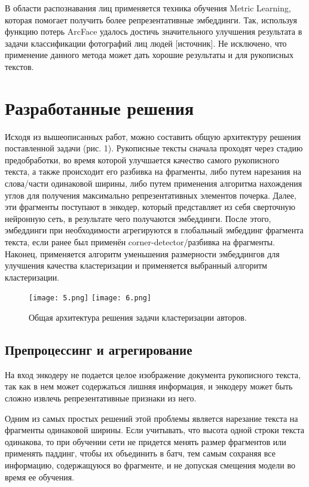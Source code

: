     В области распознавания лиц применяется техника обучения Metric Learning, которая помогает получить более репрезентативные эмбеддинги. Так, используя функцию потерь ArcFace удалось достичь значительного улучшения результата в задачи классификации фотографий лиц людей [источник]. Не исключено, что применение данного метода может дать хорошие результаты и для рукописных текстов.
    
\newpage
\section{Разработанные решения}

    Исходя из вышеописанных работ, можно составить общую архитектуру решения поставленной задачи (рис. 1). Рукописные тексты сначала проходят через стадию предобработки, во время которой улучшается качество самого рукописного текста, а также происходит его разбивка на фрагменты, либо путем нарезания на слова/части одинаковой ширины, либо путем применения алгоритма нахождения углов для получения максимально репрезентативных элементов почерка.
    Далее, эти фрагменты поступают в энкодер, который представляет из себя сверточную нейронную сеть, в результате чего получаются эмбеддинги. После этого, эмбеддинги при необходимости агрегируются в глобальный эмбеддинг фрагмента текста, если ранее был применён corner-detector/разбивка на фрагменты. Наконец, применяется алгоритм уменьшения размерности эмбеддингов для улучшения качества кластеризации и применяется выбранный алгоритм кластеризации.

    \begin{figure}[htbp]
        \centering
        \texttt{[image: 5.png]}
        \texttt{[image: 6.png]}
        \caption{Общая архитектура решения задачи кластеризации авторов.}
        \label{fig:example}
    \end{figure}

\subsection{Препроцессинг и агрегирование}

    На вход энкодеру не подается целое изображение документа рукописного текста, так как в нем может содержаться лишняя информация, и энкодеру может быть сложно извлечь репрезентативные признаки из него.

    Одним из самых простых решений этой проблемы является нарезание текста на фрагменты одинаковой ширины. Если учитывать, что высота одной строки текста одинакова, то при обучении сети не придется менять размер фрагментов или применять паддинг, чтобы их объединить в батч, тем самым сохраняя все информацию, содержащуюся во фрагменте, и не допуская смещения модели во время ее обучения. 

